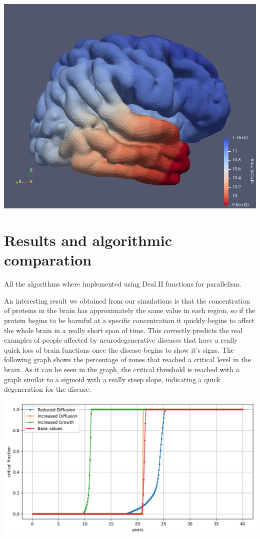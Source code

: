 \documentclass[12pt, letterpaper]{article}
\begin{document}
\includegraphics[scale=0.1]{pics/incgro.png}

\section{Results and algorithmic comparation}
All the algorithms where implemented using Deal.II functions for parallelism.


\noindent An interesting result we obtained from our simulations is that the concentration of proteins in the brain has approximately the same value in each region, so if the protein begins to be harmful at a specific concentration it quickly begins to affect the whole brain in a really short span of time. This correctly predicts the real examples of people affected by neurodegenerative diseases that have a really quick loss of brain functions once the disease begins to show it's signs. The following graph shows the percentage of zones that reached a critical level in the brain. As it can be seen in the graph, the critical threshold is reached with a graph similar to a sigmoid with a really steep slope, indicating a quick degeneration for the disease.

\noindent\includegraphics[width=\textwidth]{pics/critical_fraction_comparing.png}
\end{document}
